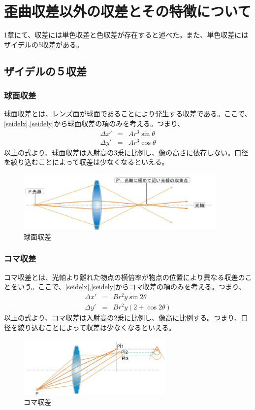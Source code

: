 \section{歪曲収差以外の収差とその特徴について}
1章にて、収差には単色収差と色収差が存在すると述べた。また、単色収差にはザイデルの5収差がある。
\subsection{ザイデルの５収差}
\subsubsection{球面収差}
球面収差とは、レンズ面が球面であることにより発生する収差である。ここで、\eqref{seidelx},\eqref{seidely}から球面収差の項のみを考える。つまり、
\begin{eqnarray}
	\Delta x' & = & A r^3 \sin \theta \\
	\Delta y' & = & A r^3 \cos \theta
\end{eqnarray}
以上の式より、球面収差は入射高の3乗に比例し、像の高さに依存しない。口径を絞り込むことによって収差は少なくなるといえる。
\begin{figure}[h]
	\centering
	\includegraphics[height=30mm]{image/kyumen.png.eps}
	\caption{球面収差\ \cite{cite1}}
	\label{caption1}
\end{figure}
\subsubsection{コマ収差}
コマ収差とは、光軸より離れた物点の横倍率が物点の位置により異なる収差のことをいう。ここで、\eqref{seidelx},\eqref{seidely}からコマ収差の項のみを考える。つまり、
\begin{eqnarray}
	\Delta x' & = & B r^2 y\sin 2 \theta \\
	\Delta y' & = & B r^2 y (2+\cos 2\theta)
\end{eqnarray}
以上の式より、コマ収差は入射高の2乗に比例し、像高に比例する。つまり、口径を絞り込むことによって収差は少なくなるといえる。
\begin{figure}[h]
	\centering
	\includegraphics[height=30mm]{image/koma.png.eps}
	\caption{コマ収差\ \cite{cite1}}
	\label{caption1}
\end{figure}
\vspace{10cm}
